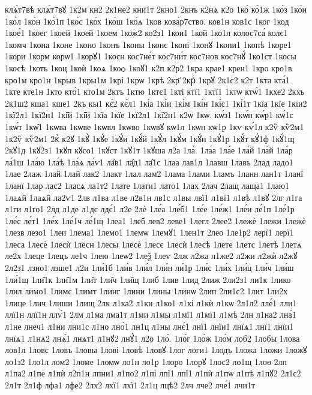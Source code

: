 {клѧ́т7вѣ
клѧ́т7вꙋ
1к2м
кн2
2к1не2
кни1т
2кно1
2кнъ
к2нѧ
к2о
1ко̀
ко́1ж
1ко́з
1ко́и
1ко́л
1ко́н
1ко́1п
1ко́с
1ко́х
1ко́ш
1ко́ѧ
1ков
кова́р7ство.
ков1н
ков1с
1ког
1код
1кое́1
1коег
1коей
1коей
1коем
1кож2
ко2з1
1кои1
1кой
1ко1л
колос7са́
колє1
1комч
1кона
1коне
1коно
1конъ
1коны
1конє
1коні
1конꙋ
1копи1
1копѣ
1коре1
1кори
1корм
корѡ1
1корꙋ1
1косн
кос7не́т
кос7ни́т
кос7нов
кос7нꙋ́
1ко1ст
1косы
1косѣ
1коть
1коц
1коѝ
1коѧ
1коѻ
1коꙋ1
к2п
к2р2
1кра
крае1
крен1
1кро
кро1в
кро1м
кро1н
1крыв
1кры1м
1крі
1крѡ
1крѣ
2кр҃
2крⷭ
1крꙋ
2к1с2
к2т
1кта
кта́1
1кте
кте1н
1кто
кто́1
кто1м
2ктъ
1ктю
1ктє1
1кті
ктї1
1ктї1
1ктѡ
ктѡ́1
1кхе2
2кхъ
2к1ш2
кша1
кше1
2къ
кы1
кє́2
кє́л1
1кі́а
1кі́и
1кі́м
1кі́н
1кі́с1
1кі́1т
1кїа
1кїе
1кїи2
1кї2л1
1кї2н1
1кі̑й
1кі̑й
1кїа
1кїе
1кї2л1
1кї2н1
к2ѡ
1кѡ.
кѡ́з1
1кѡ́н
кѡ́р1
кѡ́1с
1кѡ́т
1кѡ̑1
1кѡва
1кѡве
1кѡвл
1кѡво
1кѡвꙋ
кѡ1л
1кѡн
кѡ1р
1кѵ
кѵ́1л
к2ѷ
кѷ2м1
1к2ѷ
кѷ2м1
2кⷮ
к2ꙋ
1кꙋ̀
1кꙋ́е
1кꙋ́и
1кꙋ́й
1кꙋ́л
1кꙋ́м
1кꙋ́н
1кꙋ́1р
1кꙋ́т
кꙋ́1ф
1кꙋ́1щ
2кꙋ1д
1кꙋ2з1
1кꙋп
кꙋсо1
1кꙋст
1кꙋ1т
1кꙋша
л2а
1ла́.
1ла́а
1ла́е
1ла́й
1ла́й
1ла́р
ла́1ш
1ла́ю
1ла́ѣ
1ла́ѧ
ла́ѵ1
ла̑в1
ла̑д1
ла̑1с
1лаа
лав1л
1лавш
1лавъ
2лад
ладо1
1лае
2лаж
1лай
1лай
лак2
1лакт
1лал
лам2
1лама
1лами
1ламъ
1ланн
лан1т
1ланї
1ланї
1лар
лас2
1ласѧ
ла1т2
1лате
1лати1
лато1
1лах
2лач
2лащ
лаща1
1лаю1
1лаѧй
1лаѧй
ла2ѵ1
2лв
л1ва
л1ве
л2в1н
лв1с
л1вы
лвї1
л1вї1
л1вѣ
л1вꙋ
2лг
л1га
л1ги
л1го1
2лд
л1де
л1дє
лдє́1
л2е
2лѐ
1ле́а
1ле́б1
1ле́е
1ле́ж1
1ле́и
ле́1п
1ле́1р
1ле́с
ле́т1
1ле́х
1ле́1ч
ле́1щ
1леа1
1леб
лев2
леве1
1легл
2лее2
1лежѐ
1лежи
1лежѐ
1лезв
лезо1
1леи
1лема1
1лемо1
1лемѡ
1лемꙋ1
1лен1т
2лео
1ле1р2
лерї1
лерї1
1леса
1лесѐ
1лесѝ
1лесн
1лесы
1лесѐ
1лесє
1лесѝ
1лесѣ
1лете
1летс
1летѣ
1летѧ
ле2х
1леце
1лецъ
ле1ч
1лею
1леѡ2
1леѯ
1леѵ
2лж
л2жа
л1же2
л2жи
л2жѝ
л2жꙋ
2л2з1
лзно1
лзше1
л2и
1ли́1б
1ли́в
1ли́л
1ли́н
ли́1р
1ли́с
1ли́х
1ли́ц
1ли́ч
1ли́ш
1ли́1щ
1ли̑1к
1ли̑1м
1ли̑т
1ли̑ч
1ли̑щ
1либ
1лив
1лид
2лиж
2ли2з1
ли1к
1лико
1лил
лимо1
1лимс
1лимт
1линг
1лини
1лины
1линѡ
2лип
2ли1с2
1лит
1ли2х
1лице
1лич
1лиши
1лищ
2лк
л1ка2
л1ки
л1ко1
л1кі
л1кѝ
л1кѡ
2л1л2
лле́1
лли1
ллї1н
ллї1н
ллѵ́1
2лм
л1ма
лма1т
л1ми
л1мы
л1мї1
л1мї1
л1мѣ
2лн
л1на2
лна́1
л1не
лнеч1
л1ни
лни1с
л1но
лно́1
лн1ц
л1ны
лнє́1
лнї1
лнїи1
лнїѧ1
лнї1
лнїи1
лнїѧ1
л1нѧ2
лнѧ́1
лнѧт1
л1нꙋ2
лнꙋ́1
л2о
1ло́.
1ло́г
1ло́ж
1ло́м
лоб2
1лобы
1лова
лов1л
1ловс
1ловъ
1ловы
1лові
1ловѣ
1ловꙋ
1лог
логи1
1лодъ
1ложа
1ложи
1ложꙋ
ло1з2
1ло1л
лом2
1ломе
1ломѡ
ло1н
ло1р
1лоро
1лорꙋ
1лос2
ло1щ
1лоѳ
2лп
л1па2
л1пе
л1пѝ
л2п1н
лпни1
л1по2
л1пі
лпї1
лпї1
л1пѝ
л1пѡ
л1пѣ
л1пꙋ2
2л1с2
2л1т
2л1ф
лфа1
лфе2
2лх2
лхї1
лхї1
2л1ц
лцѣ2
2лч
лче2
лче́1
лчи1т
}
